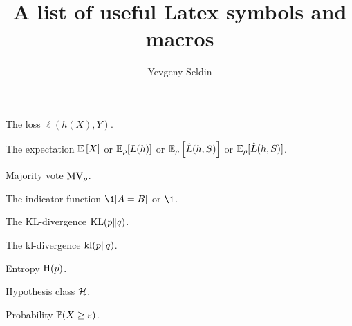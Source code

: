 \documentclass[a4paper]{article}
\title{A list of useful Latex symbols and macros}
\author{Yevgeny Seldin}
\date{}
\begin{document}
\maketitle

The loss $\ell(h(X), Y)$.

The expectation $\E[X]$ or $\E_\rho[L(h)]$ or $\E_\rho\lrs{\hat L(h,S)}$ or $\E_\rho[\hat L(h,S)]$.

Majority vote $\operatorname{MV}_\rho$.

The indicator function $\1[A = B]$ or $\1$.

The KL-divergence $\operatorname{KL}(p\|q)$.

The kl-divergence $\operatorname{kl}(p\|q)$.

Entropy $\operatorname{H}(p)$.

Hypothesis class $\mathcal H$.

Probability $\P[X \geq \varepsilon]$.
\end{document}
